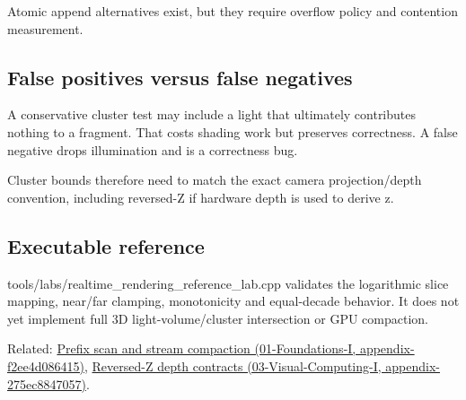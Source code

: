 Atomic append alternatives exist, but they require overflow policy and contention measurement.

\subsection{False positives versus false negatives}\label{false-positives-versus-false-negatives}

A conservative cluster test may include a light that ultimately contributes nothing to a fragment. That costs shading work but preserves correctness. A false negative drops illumination and is a correctness bug.

Cluster bounds therefore need to match the exact camera projection/depth convention, including reversed-Z if hardware depth is used to derive z.

\subsection{Executable reference}\label{executable-reference}

tools/labs/realtime\_rendering\_reference\_lab.cpp validates the logarithmic slice mapping, near/far clamping, monotonicity and equal-decade behavior. It does not yet implement full 3D light-volume/cluster intersection or GPU compaction.

Related: \href{}{Prefix scan and stream compaction (01-Foundations-I, appendix-f2ee4d086415)}, \href{}{Reversed-Z depth contracts (03-Visual-Computing-I, appendix-275ec8847057)}.

